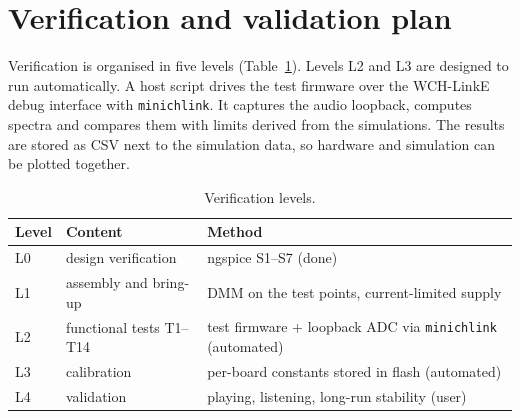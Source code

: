 \documentclass[11pt,a4paper]{article}
\newcommand{\file}[1]{\texttt{#1}}
\begin{document}
\section{Verification and validation plan}\label{sec:vv}
Verification is organised in five levels (Table~\ref{tab:levels}). Levels L2 and L3 are designed to run
automatically. A host script drives the test firmware over the WCH-LinkE debug interface with
\file{minichlink}. It captures the audio loopback, computes spectra and compares them with limits derived
from the simulations. The results are stored as CSV next to the simulation data, so hardware and simulation
can be plotted together.

\begin{table}[h]
\centering\small
\caption{Verification levels.}\label{tab:levels}
\begin{tabularx}{\textwidth}{@{}l X X@{}}
\toprule
Level & Content & Method \\
\midrule
L0 & design verification & ngspice S1--S7 (done) \\
L1 & assembly and bring-up & DMM on the test points, current-limited supply \\
L2 & functional tests T1--T14 & test firmware + loopback ADC via \file{minichlink} (automated) \\
L3 & calibration & per-board constants stored in flash (automated) \\
L4 & validation & playing, listening, long-run stability (user) \\
\bottomrule
\end{tabularx}
\end{table}
\end{document}
